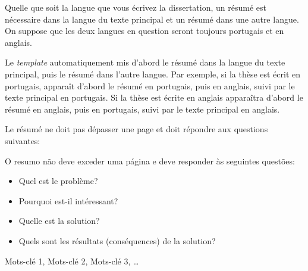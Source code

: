 

Quelle que soit la langue que vous écrivez la dissertation, un résumé est nécessaire dans la langue du texte principal et un résumé dans une autre langue. On suppose que les deux langues en question seront toujours portugais et en anglais.

Le \emph{template} automatiquement mis d'abord le résumé dans la langue du texte principal, puis le résumé dans l'autre langue. Par exemple, si la thèse est écrit en portugais, apparaît d'abord le résumé en portugais, puis en anglais, suivi par le texte principal en portugais. Si la thèse est écrite en anglais apparaîtra d'abord le résumé en anglais, puis en portugais, suivi par le texte principal en anglais.

Le résumé ne doit pas dépasser une page et doit répondre aux questions suivantes:

O resumo não deve exceder uma página e deve responder às seguintes questões:
\begin{itemize}
	\item Quel est le problème?
	\item Pourquoi est-il intéressant?
	\item Quelle est la solution?
	\item Quels sont les résultats (conséquences) de la solution?
\end{itemize}

\begin{keywords}[fr]
Mots-clé 1, Mots-clé 2, Mots-clé 3, \ldots
\end{keywords}
